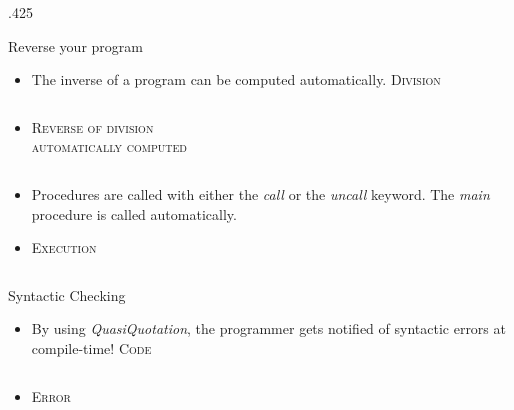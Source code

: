 \documentclass[final,hyperref={pdfpagelabels=false}]{beamer}
\newcommand\colsize{.425\textwidth}
\newcommand{\code}[1]{\inputminted[frame=lines,framesep=1cm,baselinestretch=.9,linenos,fontsize=\scriptsize]{haskell}{code/#1.hs}}
\newcommand{\codeErr}[1]{\inputminted[frame=lines,framesep=1cm,baselinestretch=.9,fontsize=\scriptsize]{bash}{code/#1_err.hs}}
\begin{document}
\begin{frame}[t]
\begin{columns}[t]
\begin{column}{\colsize}
\begin{block}{Reverse your program}
\begin{itemize}
		\item The inverse of a program can be computed automatically.
		\center
		\textsc{\small Division}\\ \vspace{1cm}
		\begin{minipage}{.8\textwidth}
		\code{divide}
		\end{minipage}
		\vspace{1cm}
		\item \textsc{\small Reverse of division}\\ 			\textsc{\tiny{automatically computed}} \\ \vspace{1cm}
		\begin{minipage}{.8\textwidth}
		\code{divide_reverse}
		\end{minipage}
	\end{itemize}
	\begin{itemize}
\item Procedures are called with either the \textit{call} or the \textit{uncall} keyword. The \textit{main} procedure is called automatically. 	
		\item
		\center
		\textsc{\small Execution}\\ \vspace{1cm}
		\begin{minipage}{.8\textwidth}
		\code{call_uncall}
		\end{minipage}
		\end{itemize}
\end{block}

\begin{block}{Syntactic Checking}
	\begin{itemize}
		\item By using \textit{QuasiQuotation}, the programmer gets notified of syntactic errors at compile-time!
	\center
	\textsc{\small Code}\\ \vspace{1cm}
	\begin{minipage}{.8\textwidth}
	\code{syntax}
	\end{minipage}
	\vspace{1cm}
	\item \textsc{\small Error}\\ \vspace{1cm}
	\begin{minipage}{.8\textwidth}
	\codeErr{syntax}
	\end{minipage}
	\end{itemize}
\end{block}


\end{column}
\end{columns}
\end{frame}
\end{document}
